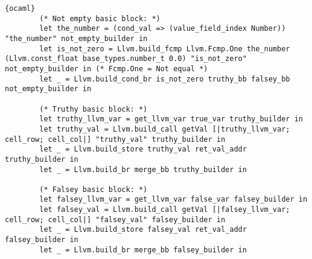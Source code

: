 \begin{lstlisting}{ocaml}
        (* Not empty basic block: *)
        let the_number = (cond_val => (value_field_index Number)) "the_number" not_empty_builder in
        let is_not_zero = Llvm.build_fcmp Llvm.Fcmp.One the_number (Llvm.const_float base_types.number_t 0.0) "is_not_zero" not_empty_builder in (* Fcmp.One = Not equal *)
        let _ = Llvm.build_cond_br is_not_zero truthy_bb falsey_bb not_empty_builder in

        (* Truthy basic block: *)
        let truthy_llvm_var = get_llvm_var true_var truthy_builder in
        let truthy_val = Llvm.build_call getVal [|truthy_llvm_var; cell_row; cell_col|] "truthy_val" truthy_builder in
        let _ = Llvm.build_store truthy_val ret_val_addr truthy_builder in
        let _ = Llvm.build_br merge_bb truthy_builder in

        (* Falsey basic block: *)
        let falsey_llvm_var = get_llvm_var false_var falsey_builder in
        let falsey_val = Llvm.build_call getVal [|falsey_llvm_var; cell_row; cell_col|] "falsey_val" falsey_builder in
        let _ = Llvm.build_store falsey_val ret_val_addr falsey_builder in
        let _ = Llvm.build_br merge_bb falsey_builder in


\end{lstlisting}
